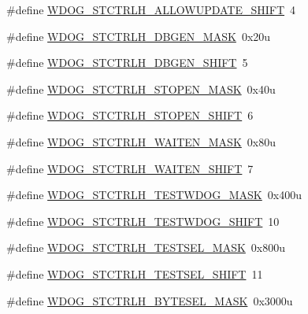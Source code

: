 \begin{DoxyCompactItemize}
\item 
\#define \hyperlink{group___w_d_o_g___register___masks_gaf2ae60bccb334321f860b2480d916604}{W\+D\+O\+G\+\_\+\+S\+T\+C\+T\+R\+L\+H\+\_\+\+A\+L\+L\+O\+W\+U\+P\+D\+A\+T\+E\+\_\+\+S\+H\+I\+FT}~4
\item 
\#define \hyperlink{group___w_d_o_g___register___masks_ga837911a61f223e74ea90cca76f08a787}{W\+D\+O\+G\+\_\+\+S\+T\+C\+T\+R\+L\+H\+\_\+\+D\+B\+G\+E\+N\+\_\+\+M\+A\+SK}~0x20u
\item 
\#define \hyperlink{group___w_d_o_g___register___masks_ga9fdcaa733bd0393d4bce730c1d2c90c5}{W\+D\+O\+G\+\_\+\+S\+T\+C\+T\+R\+L\+H\+\_\+\+D\+B\+G\+E\+N\+\_\+\+S\+H\+I\+FT}~5
\item 
\#define \hyperlink{group___w_d_o_g___register___masks_gab78af949041ea10c257c8276c8e2782a}{W\+D\+O\+G\+\_\+\+S\+T\+C\+T\+R\+L\+H\+\_\+\+S\+T\+O\+P\+E\+N\+\_\+\+M\+A\+SK}~0x40u
\item 
\#define \hyperlink{group___w_d_o_g___register___masks_ga46b2b7b0c6a5938cfa26d96ba332d5d0}{W\+D\+O\+G\+\_\+\+S\+T\+C\+T\+R\+L\+H\+\_\+\+S\+T\+O\+P\+E\+N\+\_\+\+S\+H\+I\+FT}~6
\item 
\#define \hyperlink{group___w_d_o_g___register___masks_gad6e2dd88be51a78f133085bb0df3a5f9}{W\+D\+O\+G\+\_\+\+S\+T\+C\+T\+R\+L\+H\+\_\+\+W\+A\+I\+T\+E\+N\+\_\+\+M\+A\+SK}~0x80u
\item 
\#define \hyperlink{group___w_d_o_g___register___masks_gad224b313777fd019f8ec46f1791a52b7}{W\+D\+O\+G\+\_\+\+S\+T\+C\+T\+R\+L\+H\+\_\+\+W\+A\+I\+T\+E\+N\+\_\+\+S\+H\+I\+FT}~7
\item 
\#define \hyperlink{group___w_d_o_g___register___masks_ga155c6ba1a6269c937ad8a1e1500686aa}{W\+D\+O\+G\+\_\+\+S\+T\+C\+T\+R\+L\+H\+\_\+\+T\+E\+S\+T\+W\+D\+O\+G\+\_\+\+M\+A\+SK}~0x400u
\item 
\#define \hyperlink{group___w_d_o_g___register___masks_ga3b923179c1bd41abe9fbab0ee57740c0}{W\+D\+O\+G\+\_\+\+S\+T\+C\+T\+R\+L\+H\+\_\+\+T\+E\+S\+T\+W\+D\+O\+G\+\_\+\+S\+H\+I\+FT}~10
\item 
\#define \hyperlink{group___w_d_o_g___register___masks_gad8ac03c1a9c77ee59f938c243db30a42}{W\+D\+O\+G\+\_\+\+S\+T\+C\+T\+R\+L\+H\+\_\+\+T\+E\+S\+T\+S\+E\+L\+\_\+\+M\+A\+SK}~0x800u
\item 
\#define \hyperlink{group___w_d_o_g___register___masks_gaf41cdd95d386a6b663fa3adea03699e1}{W\+D\+O\+G\+\_\+\+S\+T\+C\+T\+R\+L\+H\+\_\+\+T\+E\+S\+T\+S\+E\+L\+\_\+\+S\+H\+I\+FT}~11
\item 
\#define \hyperlink{group___w_d_o_g___register___masks_ga20d3012eda5935f73ec4a9e24720fdc2}{W\+D\+O\+G\+\_\+\+S\+T\+C\+T\+R\+L\+H\+\_\+\+B\+Y\+T\+E\+S\+E\+L\+\_\+\+M\+A\+SK}~0x3000u

\end{DoxyCompactItemize}
